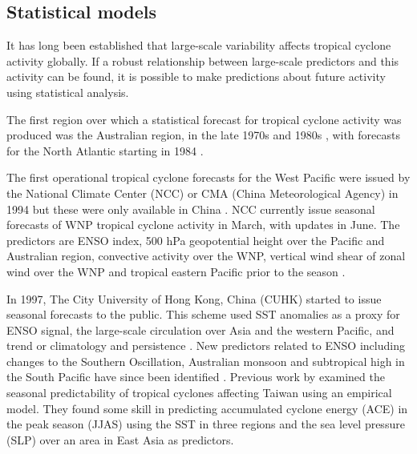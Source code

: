 

\subsection{Statistical models}  
It has long been established that large-scale variability affects tropical cyclone activity globally. If a robust relationship between large-scale predictors and this activity can be found, it is possible to make predictions about future activity using statistical analysis.

The first region over which a statistical forecast for tropical cyclone activity was produced was the Australian region, in the late 1970s and 1980s \citep{nicholls1979possible, nicholls1985predictability}, with forecasts for the North Atlantic starting in 1984 \citep{gray1984atlantic}.

The first operational tropical cyclone forecasts for the West Pacific were issued by the National Climate Center (NCC) or CMA (China Meteorological Agency) in 1994 but these were only available in China \citep{zhan2012seasonal}. NCC currently issue seasonal forecasts of WNP tropical cyclone activity in March, with updates in June. The predictors are ENSO index, 500 hPa geopotential height over the Pacific and Australian region, convective activity over the WNP, vertical wind shear of zonal wind over the WNP and tropical eastern Pacific prior to the season \citep{zhan2012seasonal}.%

In 1997, The City University of Hong Kong, China (CUHK) started to issue seasonal forecasts to the public.  This scheme used SST anomalies as a proxy for ENSO signal, the large-scale circulation over Asia and the western Pacific, and trend or climatology and persistence \citep{chan1998seasonal}. New predictors related to ENSO including changes to the Southern Oscillation, Australian monsoon and subtropical high in the South Pacific have since been identified \citep{cl2001improvements}.
Previous work by \cite{lu2013seasonal} examined the seasonal predictability of tropical cyclones affecting Taiwan using an empirical model. They found some skill in predicting accumulated cyclone energy (ACE) in the peak season (JJAS) using the SST in three regions and the sea level pressure (SLP) over an area in East Asia as predictors. 


